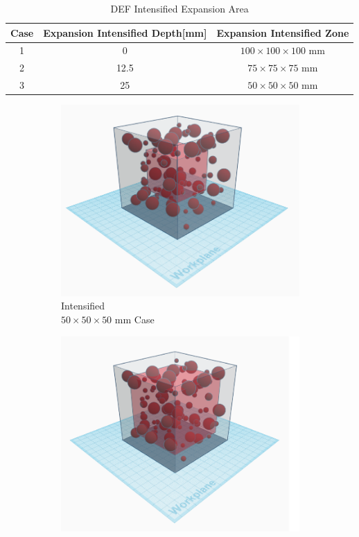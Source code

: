 \begin{table}[ht!]
  \caption{DEF Intensified Expansion Area}
\centering
\begin{tabular}{||c c c||}
 \hline
 Case &  Expansion Intensified Depth[mm] &  Expansion Intensified Zone \\ [0.5ex]
 \hline\hline
 1 & 0 & $100 \times 100 \times 100$ mm \\
 2 & 12.5 & $75 \times 75 \times 75$ mm \\
 3 & 25 & $50 \times 50 \times 50$ mm \\ [0.5ex]
 \hline
\end{tabular}

\label{table:DEF_X}
\end{table}

\begin{figure}[ht]
\centering
    \begin{subfigure}{.33\textwidth}
      \centering
      \includegraphics[width=.8\linewidth]{Files/DEF_X/X0_3d.png}
      \caption{Intensified  \\ $50 \times 50 \times 50$ mm Case}
    \end{subfigure}%
    \begin{subfigure}{.33\textwidth}
      \centering
      \includegraphics[width=.8\linewidth]{Files/DEF_X/X-5_3d.png}

\end{subfigure}
\end{figure}

